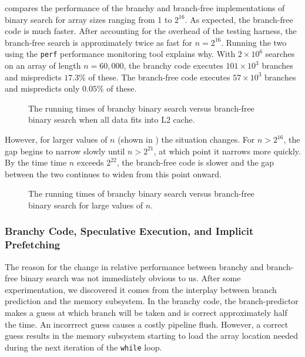 \documentclass{patmorin}
\begin{document}
 compares the performance of the branchy and
branch-free implementations of binary search for array sizes ranging from
1 to $2^{16}$.  As expected, the branch-free code is much faster. After
accounting for the overhead of the testing harness, the branch-free
search is approximately twice as fast for $n=2^{16}$.  Running the two
using the \texttt{perf} performance monitoring tool explains
why.  With $2\times 10^6$ searches on an array of length
$n=60,000$, the branchy code executes $101\times 10^3$ branches and
mispredicts $17.3\%$ of these.  The branch-free code executes $57\times
10^3$ branches and mispredicts only $0.05\%$ of these.

\begin{figure}
   \caption{The running times of branchy binary search versus
    branch-free binary search when all data
    fits into L2 cache.}
\end{figure}

However, for larger values of $n$ (shown in ) the
situation changes.  For $n>2^{16}$, the gap begins to narrow slowly
until $n>2^{21}$, at which point it narrows more quickly.  By the time
time $n$ exceeds $2^{22}$, the branch-free code is slower and the gap
between the two continues to widen from this point onward.

\begin{figure}
   \caption{The running times of branchy binary search versus
    branch-free binary search for large values of $n$.}
\end{figure}

\subsubsection{Branchy Code, Speculative Execution, and Implicit Prefetching}

The reason for the change in relative performance between branchy
and branch-free binary search was not immediately obvious to us.
After some experimentation, we discovered it comes from the interplay
between branch prediction and the memory subsystem.  In the branchy
code, the branch-predictor makes a guess at which branch will be taken
and is correct approximately half the time. An incorrrect guess causes a
costly pipeline flush.  However, a correct guess results in the memory
subsystem starting to load the array location needed during the next
iteration of the \texttt{while} loop.
\end{document}
